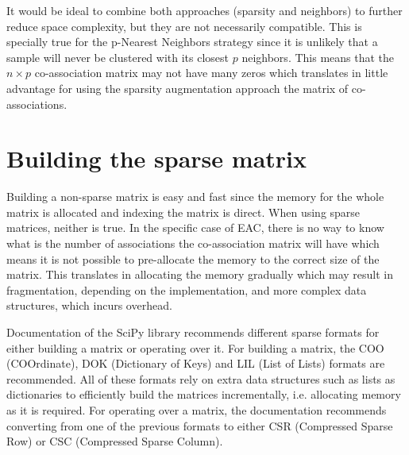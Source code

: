 It would be ideal to combine both approaches (sparsity and neighbors) to further reduce space complexity, but they are not necessarily compatible.
This is specially true for the p-Nearest Neighbors strategy since it is unlikely that a sample will never be clustered with its closest $p$ neighbors.
This means that the $n \times p$ co-association matrix may not have many zeros which translates in little advantage for using the sparsity augmentation approach the matrix of co-associations.

\section{Building the sparse matrix}
\label{sec:sparse coassoc}

Building a non-sparse matrix is easy and fast since the memory for the whole matrix is allocated and indexing the matrix is direct.
When using sparse matrices, neither is true.
In the specific case of EAC, there is no way to know what is the number of associations the co-association matrix will have which means it is not possible to pre-allocate the memory to the correct size of the matrix.
This translates in allocating the memory gradually which may result in fragmentation, depending on the implementation, and more complex data structures, which incurs overhead.


Documentation of the SciPy library recommends different sparse formats for either building a matrix or operating over it.
For building a matrix, the COO (COOrdinate), DOK (Dictionary of Keys) and LIL (List of Lists) formats are recommended.
All of these formats rely on extra data structures such as lists as dictionaries to efficiently build the matrices incrementally, i.e. allocating memory as it is required.
For operating over a matrix, the documentation recommends converting from one of the previous formats to either CSR (Compressed Sparse Row) or CSC (Compressed Sparse Column).

